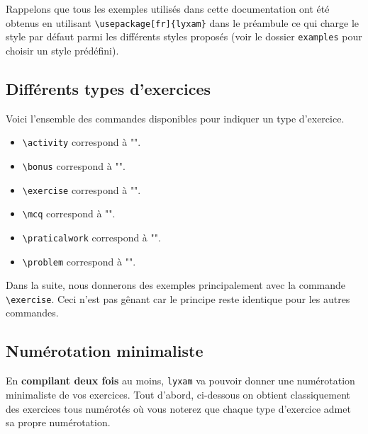 \documentclass[12pt,a4paper]{scrartcl}
\theoremstyle{definition}
\begin{document}
Rappelons que tous les exemples utilisés dans cette documentation ont été obtenus en utilisant \verb+\usepackage[fr]{lyxam}+ dans le préambule ce qui charge le style par défaut parmi les différents styles proposés (voir le dossier \verb+examples+ pour choisir un style prédéfini).


    \subsection{Différents types d'exercices}

Voici l'ensemble des commandes disponibles pour indiquer un type d'exercice.

\begin{itemize}
\makeatletter
    \item \verb+\activity+ correspond à "\lyxam@text@activity{}".
    
    \item \verb+\bonus+ correspond à "\lyxam@text@bonus{}".
    
    \item \verb+\exercise+ correspond à "\lyxam@text@exercise{}".
    
    \item \verb+\mcq+ correspond à "\lyxam@text@mcq{}".
    
    \item \verb+\praticalwork+ correspond à "\lyxam@text@praticalwork{}".
    
    \item \verb+\problem+ correspond à "\lyxam@text@problem{}".
\makeatother
\end{itemize}

Dans la suite, nous donnerons des exemples principalement avec la commande \verb+\exercise+. Ceci n'est pas gênant car le principe reste identique pour les autres commandes.


    \subsection{Numérotation minimaliste}

En \textbf{compilant deux fois} au moins, \verb+lyxam+ va pouvoir donner une numérotation minimaliste de vos exercices. Tout d'abord, ci-dessous on obtient classiquement des exercices tous numérotés où vous noterez que chaque type d'exercice admet sa propre numérotation.


\begin{tcblisting}{}
\exercise
\exercise
\problem
\problem
\end{tcblisting}
\end{document}
